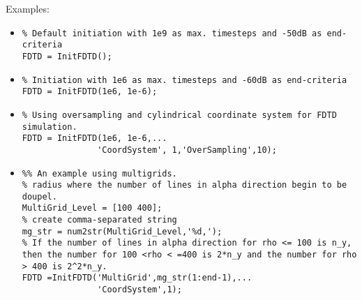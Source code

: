 \begin{FontDescr}{Examples:}
\begin{itemize}
\item
\begin{lstlisting}
% Default initiation with 1e9 as max. timesteps and -50dB as end-criteria
FDTD = InitFDTD();
\end{lstlisting}

\item
\begin{lstlisting}
% Initiation with 1e6 as max. timesteps and -60dB as end-criteria
FDTD = InitFDTD(1e6, 1e-6);
\end{lstlisting}

\item
\begin{lstlisting}
% Using oversampling and cylindrical coordinate system for FDTD simulation.
FDTD = InitFDTD(1e6, 1e-6,...
               'CoordSystem', 1,'OverSampling',10);
\end{lstlisting}

\item
\begin{lstlisting}
%% An example using multigrids.
% radius where the number of lines in alpha direction begin to be doupel.
MultiGrid_Level = [100 400];
% create comma-separated string
mg_str = num2str(MultiGrid_Level,'%d,');
% If the number of lines in alpha direction for rho <= 100 is n_y, then the number for 100 <rho < =400 is 2*n_y and the number for rho > 400 is 2^2*n_y.
FDTD =InitFDTD('MultiGrid',mg_str(1:end-1),...
               'CoordSystem',1);
\end{lstlisting}
\end{itemize}	
\end{FontDescr}



